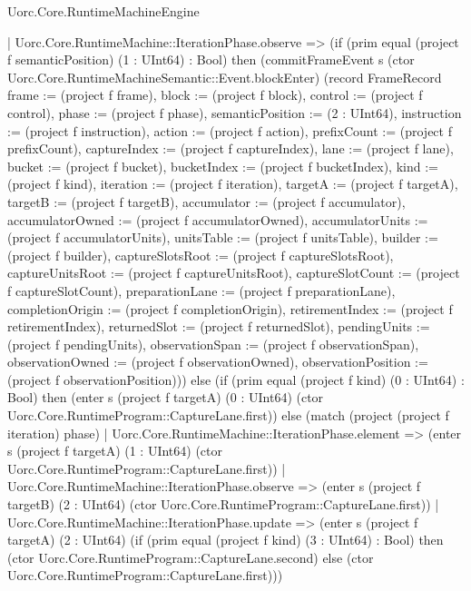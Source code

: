 \begin{lexlean}{Uorc.Core.RuntimeMachineEngine}
\begin{semanticmodule}
{      | Uorc.Core.RuntimeMachine::IterationPhase.observe => (if (prim equal (project f semanticPosition) (1 : UInt64) : Bool) then (commitFrameEvent s (ctor Uorc.Core.RuntimeMachineSemantic::Event.blockEnter) (record FrameRecord {frame := (project f frame), block := (project f block), control := (project f control), phase := (project f phase), semanticPosition := (2 : UInt64), instruction := (project f instruction), action := (project f action), prefixCount := (project f prefixCount), captureIndex := (project f captureIndex), lane := (project f lane), bucket := (project f bucket), bucketIndex := (project f bucketIndex), kind := (project f kind), iteration := (project f iteration), targetA := (project f targetA), targetB := (project f targetB), accumulator := (project f accumulator), accumulatorOwned := (project f accumulatorOwned), accumulatorUnits := (project f accumulatorUnits), unitsTable := (project f unitsTable), builder := (project f builder), captureSlotsRoot := (project f captureSlotsRoot), captureUnitsRoot := (project f captureUnitsRoot), captureSlotCount := (project f captureSlotCount), preparationLane := (project f preparationLane), completionOrigin := (project f completionOrigin), retirementIndex := (project f retirementIndex), returnedSlot := (project f returnedSlot), pendingUnits := (project f pendingUnits), observationSpan := (project f observationSpan), observationOwned := (project f observationOwned), observationPosition := (project f observationPosition)})) else (if (prim equal (project f kind) (0 : UInt64) : Bool) then (enter s (project f targetA) (0 : UInt64) (ctor Uorc.Core.RuntimeProgram::CaptureLane.first)) else (match (project (project f iteration) phase)
        | Uorc.Core.RuntimeMachine::IterationPhase.element => (enter s (project f targetA) (1 : UInt64) (ctor Uorc.Core.RuntimeProgram::CaptureLane.first))
        | Uorc.Core.RuntimeMachine::IterationPhase.observe => (enter s (project f targetB) (2 : UInt64) (ctor Uorc.Core.RuntimeProgram::CaptureLane.first))
        | Uorc.Core.RuntimeMachine::IterationPhase.update => (enter s (project f targetA) (2 : UInt64) (if (prim equal (project f kind) (3 : UInt64) : Bool) then (ctor Uorc.Core.RuntimeProgram::CaptureLane.second) else (ctor Uorc.Core.RuntimeProgram::CaptureLane.first)))
}
\end{semanticmodule}
\end{lexlean}
